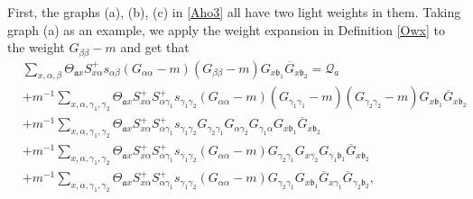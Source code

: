 \documentclass{article}
\newcommand{\1}{\mathds{1}}
\numberwithin{equation}{section}
\newcommand{\al}{\alpha}
\newcommand{\fa}{{\mathfrak a}}
\newcommand{\fb}{{\mathfrak b}}
\renewcommand{\cal}{\mathcal}
\theoremstyle{plain} %
\theoremstyle{remark}
\begin{document}
First, the graphs (a), (b), (c) in \eqref{Aho3} all have two light weights in them. Taking graph (a) as an example, we apply the weight expansion in Definition \ref{Owx} to the weight $G_{\beta\beta}-m$ and get that
\begin{align*}
& \sum_{x,\al,\beta} \Theta_{\fa x}  S^+_{x\al}s_{\al\beta} (G_{\al\al}-m)(G_{\beta\beta}-m) G_{x\fb_1}\overline G_{x\fb_2}=  \cal Q_a\\
& + m^{-1} \sum_{x,\al,\gamma_1,\gamma_2} \Theta_{\fa x} S^+_{x\al}S^+_{\al\gamma_1}s_{\gamma_1\gamma_2}(G_{\al\al}-m)(G_{\gamma_1\gamma_1}-m)(G_{\gamma_2\gamma_2}-m) G_{x\fb_1}\overline G_{x\fb_2} \tag{a1}\\
& +m^{-1} \sum_{x,\al, \gamma_1,\gamma_2} \Theta_{\fa x}  S^+_{x\al}S^+_{\al \gamma_1}s_{\gamma_1\gamma_2} G_{\gamma_2\gamma_1} G_{\al\gamma_2}G_{\gamma_1\al} G_{x\fb_1}\overline G_{x\fb_2} \tag{a2} \\
& + m^{-1} \sum_{x,\al,\gamma_1,\gamma_2} \Theta_{\fa x}  S^+_{x\al}S^+_{\al \gamma_1}s_{\gamma_1\gamma_2} (G_{\al\al}-m) G_{\gamma_2\gamma_1}  G_{x \gamma_2}G_{\gamma_1 \fb_1}\overline G_{x \fb_2} \tag{a3}  \\
& +m^{-1} \sum_{x,\al, \gamma_1,\gamma_2} \Theta_{\fa x}  S^+_{x\al} S^+_{\al\gamma_1}s_{\gamma_1\gamma_2} (G_{\al\al}-m) G_{\gamma_2\gamma_1}  G_{x\fb_1}\overline G_{x \gamma_1} \overline G_{\gamma_2 \fb_2} , \tag{a4}
 \end{align*}
\end{document}
